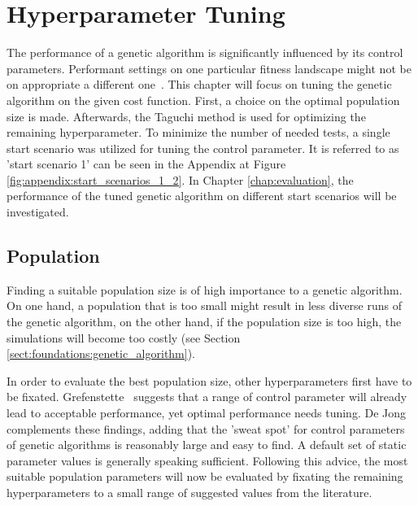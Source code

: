 \chapter{Hyperparameter Tuning}
\label{chap:hyperparameter_tuning}
The performance of a genetic algorithm is significantly influenced by its control parameters. Performant settings on one particular fitness landscape might not be on appropriate a different one~\cite{kacprzyk_parameter_2007}. This chapter will focus on tuning the genetic algorithm on the given cost function. First, a choice on the optimal population size is made. Afterwards, the Taguchi method is used for optimizing the remaining hyperparameter. To minimize the number of needed tests, a single start scenario was utilized for tuning the control parameter. It is referred to as 'start scenario 1' can be seen in the Appendix at Figure \ref{fig:appendix:start_scenarios_1_2}.  In Chapter \ref{chap:evaluation}, the performance of the tuned genetic algorithm on different start scenarios will be investigated.

\section{Population}
\label{sect:hyperparameter_tuning:population}
Finding a suitable population size is of high importance to a genetic algorithm. On one hand, a population that is too small might result in less diverse runs of the genetic algorithm, on the other hand, if the population size is too high, the simulations will become too costly (see Section \ref{sect:foundations:genetic_algorithm}).

In order to evaluate the best population size, other hyperparameters first have to be fixated. Grefenstette~\cite{grefenstette_optimization_1986} suggests that a range of control parameter will already lead to acceptable performance, yet optimal performance needs tuning. De Jong~\cite{kacprzyk_parameter_2007} complements these findings, adding that the 'sweat spot' for control parameters of genetic algorithms is reasonably large and easy to find. A default set of static parameter values is generally speaking sufficient. Following this advice, the most suitable population parameters will now be evaluated by fixating the remaining hyperparameters to a small range of suggested values from the literature.

